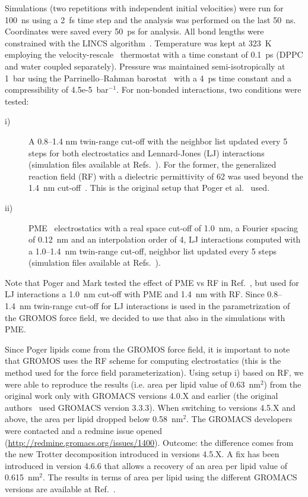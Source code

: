 \documentclass[journal=jacsat,manuscript=article]{achemso}
\begin{document}
Simulations (two repetitions with independent initial velocities) were run for 100~ns using a 2~fs time step and the analysis 
was performed on the last 50~ns. Coordinates were saved every 50~ps for analysis. All bond lengths were constrained with the LINCS algorithm~\cite{hess97,hess07}. Temperature was kept 
at 323~K employing the velocity-rescale~\cite{bussi07} thermostat with a time constant of 0.1~ps (DPPC and water coupled separately). Pressure was maintained semi-isotropically at 1~bar using 
the Parrinello--Rahman barostat~\cite{parrinello81} with a 4~ps time constant and a compressibility of 4.5e-5~bar$^{-1}$. For non-bonded interactions, two conditions were tested:
\begin{description}
\item[i)]
{\noindent A 0.8--1.4 nm twin-range cut-off with the neighbor list updated every 5 steps for both electrostatics and Lennard-Jones (LJ) interactions 
(simulation files available at Refs.~). For the former, the generalized reaction 
field (RF) with a dielectric permittivity of 62 was used beyond the 1.4~nm cut-off~\cite{tironi95}. This is the original setup that Poger et al.~\cite{poger10} used.
}
\item[ii)]
{\noindent PME~\cite{darden93,essman95} electrostatics with a real space cut-off of 1.0~nm, a Fourier spacing of 0.12~nm and an interpolation order of 4, LJ interactions computed with a 1.0--1.4~nm twin-range cut-off,
neighbor list updated every 5 steps (simulation files available at Refs.~).
}
\end{description}
Note that Poger and Mark tested the effect of PME vs RF in Ref.~, but used for LJ interactions a 1.0~nm cut-off with PME and 1.4~nm with RF. Since 0.8--1.4~nm twin-range cut-off for LJ interactions is used in the parametrization of the GROMOS force field, we decided to use that also in the simulations with PME.

Since Poger lipids come from the GROMOS force field, it is important to note that GROMOS uses the RF scheme for computing electrostatics (this is the method used for the 
force field parameterization). Using setup i) based on RF, we were able to reproduce the results (i.e. area per lipid value of 0.63~nm$^2$) from the original work only with 
GROMACS versions 4.0.X and earlier (the original authors~\cite{poger10} used GROMACS version 3.3.3). When switching to versions 4.5.X and above, the area per lipid dropped below 0.58~nm$^2$. 
The GROMACS developers were contacted and a redmine issue opened (\url{http://redmine.gromacs.org/issues/1400}). Outcome: the difference comes from the new Trotter decomposition 
introduced in versions 4.5.X. A fix has been introduced in version 4.6.6 that allows a recovery of an area per lipid value of 0.615~nm$^2$. The results in terms of area per lipid using the different 
GROMACS versions are available at Ref.~.
\end{document}
